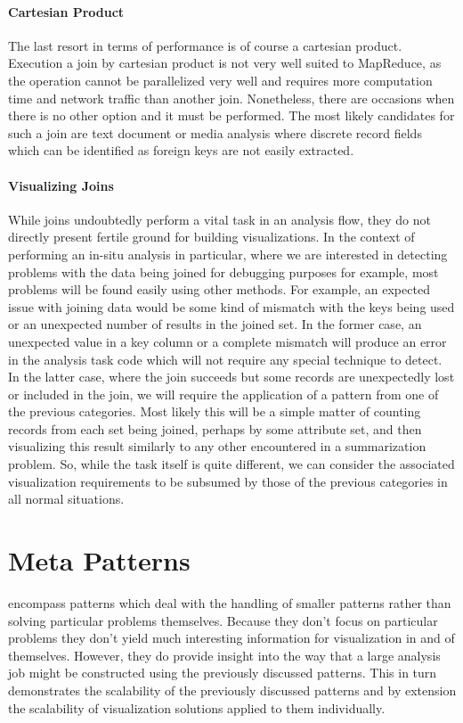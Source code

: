 \paragraph{Cartesian Product}
The last resort in terms of performance is of course a cartesian product. Execution a join by cartesian product is not very well suited to MapReduce, as the operation cannot be parallelized very well and requires more computation time and network traffic than another join. Nonetheless, there are occasions when there is no other option and it must be performed. The most likely candidates for such a join are text document or media analysis where discrete record fields which can be identified as foreign keys are not easily extracted. 

\paragraph{Visualizing Joins}
While joins undoubtedly perform a vital task in an analysis flow, they do not directly present fertile ground for building visualizations. In the context of performing an in-situ analysis in particular, where we are interested in detecting problems with the data  being joined for debugging purposes for example, most problems will be found easily using other methods. For example, an expected issue with joining data would be some kind of mismatch with the keys being used or an unexpected number of results in the joined set. In the former case, an unexpected value in a key column or a complete mismatch will produce an error in the analysis task code which will not require any special technique to detect. In the latter case, where the join succeeds but some records are unexpectedly lost or included in the join, we will require the application of a pattern from one of the previous categories. Most likely this will be a simple matter of counting records from each set being joined, perhaps by some attribute set, and then visualizing this result similarly to any other encountered in a summarization problem. So, while the task itself is quite different, we can consider the associated visualization requirements to be subsumed by those of the previous categories in all normal situations.

\section{Meta Patterns}
\label{sec:metapatterns}
 encompass patterns which deal with the handling of smaller patterns rather than solving particular problems themselves. Because they don't focus on particular problems they don't yield much interesting information for visualization in and of themselves. However, they do provide insight into the way that a large analysis job might be constructed using the previously discussed patterns. This in turn demonstrates the scalability of the previously discussed patterns and by extension the scalability of visualization solutions applied to them individually.

